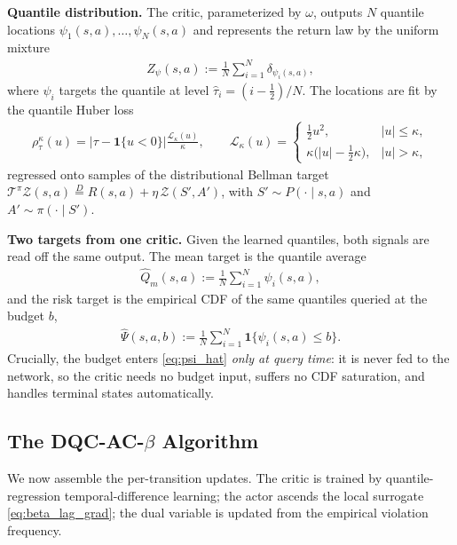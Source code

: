 \textbf{Quantile distribution.} The critic, parameterized by $\omega$, outputs $N$ quantile locations $\psi_1(s,a),\dots,\psi_N(s,a)$ and represents the return law by the uniform mixture
\begin{align}
    Z_{\psi}(s,a)
    :=
    \frac{1}{N}\sum_{i=1}^{N}\delta_{\psi_i(s,a)},
\end{align}
where $\psi_i$ targets the quantile at level $\hat{\tau}_i=(i-\tfrac{1}{2})/N$. The locations are fit by the quantile Huber loss
\begin{align}\label{eq:qhuber}
    \rho_{\tau}^{\kappa}(u)=\left|\tau-\mathbf{1}\{u<0\}\right|\frac{\mathcal{L}_{\kappa}(u)}{\kappa},
    \qquad
    \mathcal{L}_{\kappa}(u)=
    \begin{cases}
        \tfrac{1}{2}u^2, & |u|\le\kappa,\\[2pt]
        \kappa\bigl(|u|-\tfrac{1}{2}\kappa\bigr), & |u|>\kappa,
    \end{cases}
\end{align}
regressed onto samples of the distributional Bellman target $\mathcal{T}^{\pi}\mathcal{Z}(s,a)\overset{D}{=}R(s,a)+\eta\,\mathcal{Z}(S',A')$, with $S'\sim P(\cdot\mid s,a)$ and $A'\sim\pi(\cdot\mid S')$.

\textbf{Two targets from one critic.} Given the learned quantiles, both signals are read off the same output. The mean target is the quantile average
\begin{align}\label{eq:qm_hat}
    \widehat{Q}_m(s,a)
    :=
    \frac{1}{N}\sum_{i=1}^{N}\psi_i(s,a),
\end{align}
and the risk target is the empirical CDF of the same quantiles queried at the budget $b$,
\begin{align}\label{eq:psi_hat}
    \widehat{\Psi}(s,a,b)
    :=
    \frac{1}{N}\sum_{i=1}^{N}\mathbf{1}\{\psi_i(s,a)\le b\}.
\end{align}
Crucially, the budget enters \eqref{eq:psi_hat} \emph{only at query time}: it is never fed to the network, so the critic needs no budget input, suffers no CDF saturation, and handles terminal states automatically.

\subsection{The DQC-AC-$\beta$ Algorithm}\label{sec:algo}
We now assemble the per-transition updates. The critic is trained by quantile-regression temporal-difference learning; the actor ascends the local surrogate \eqref{eq:beta_lag_grad}; the dual variable is updated from the empirical violation frequency.

